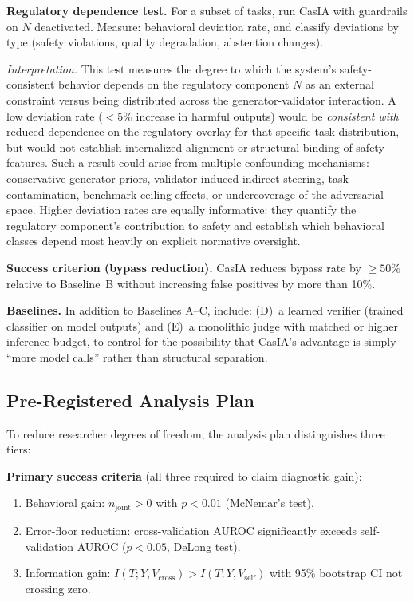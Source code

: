 \documentclass[11pt,a4paper]{article}
\theoremstyle{definition}
\begin{document}
\textbf{Regulatory dependence test.} For a subset of tasks, run CasIA with guardrails on $N$ deactivated. Measure: behavioral deviation rate, and classify deviations by type (safety violations, quality degradation, abstention changes).

\emph{Interpretation.} This test measures the degree to which the system's safety-consistent behavior depends on the regulatory component $N$ as an external constraint versus being distributed across the generator-validator interaction. A low deviation rate ($<5\%$ increase in harmful outputs) would be \emph{consistent with} reduced dependence on the regulatory overlay for that specific task distribution, but would not establish internalized alignment or structural binding of safety features. Such a result could arise from multiple confounding mechanisms: conservative generator priors, validator-induced indirect steering, task contamination, benchmark ceiling effects, or undercoverage of the adversarial space. Higher deviation rates are equally informative: they quantify the regulatory component's contribution to safety and establish which behavioral classes depend most heavily on explicit normative oversight.

\textbf{Success criterion (bypass reduction).} CasIA reduces bypass rate by $\geq 50\%$ relative to Baseline~B without increasing false positives by more than 10\%.

\textbf{Baselines.} In addition to Baselines A--C, include: (D)~a learned verifier (trained classifier on model outputs) and (E)~a monolithic judge with matched or higher inference budget, to control for the possibility that CasIA's advantage is simply ``more model calls'' rather than structural separation.


\subsection{Pre-Registered Analysis Plan}
\label{subsec:falsification}

To reduce researcher degrees of freedom, the analysis plan distinguishes three tiers:

\textbf{Primary success criteria} (all three required to claim diagnostic gain):
\begin{enumerate}[leftmargin=*,itemsep=2pt]
\item Behavioral gain: $n_\text{joint} > 0$ with $p < 0.01$ (McNemar's test).
\item Error-floor reduction: cross-validation AUROC significantly exceeds self-validation AUROC ($p < 0.05$, DeLong test).
\item Information gain: $I(T; Y, V_\text{cross}) > I(T; Y, V_\text{self})$ with 95\% bootstrap CI not crossing zero.
\end{enumerate}
\end{document}
